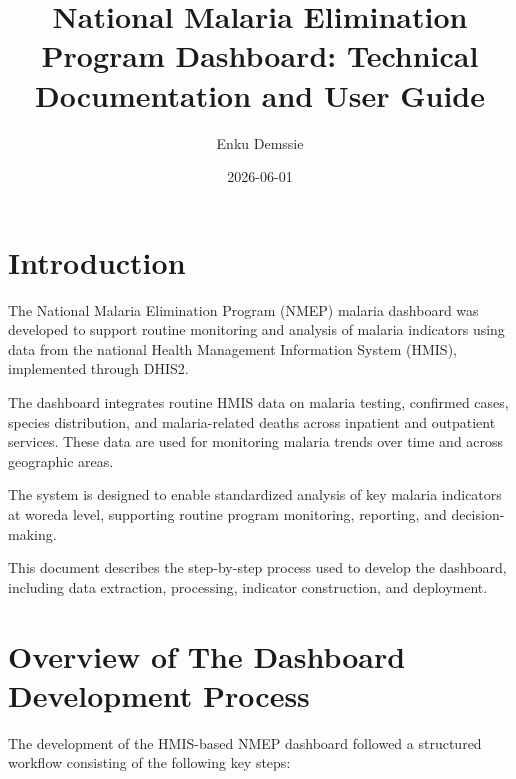 \documentclass[
  letterpaper,
  DIV=11,
  numbers=noendperiod]{scrartcl}
\title{National Malaria Elimination Program Dashboard: Technical
Documentation and User Guide}
\author{Enku Demssie}
\date{2026-06-01}
\renewcommand*\contentsname{Table of contents}
\newcommand\contentsname{Table of contents}
\begin{document}
\maketitle

\renewcommand*\contentsname{Table of contents}
{
\hypersetup{linkcolor=}
\setcounter{tocdepth}{4}
\tableofcontents
}

\section{Introduction}\label{introduction}

The National Malaria Elimination Program (NMEP) malaria dashboard was
developed to support routine monitoring and analysis of malaria
indicators using data from the national Health Management Information
System (HMIS), implemented through DHIS2.

The dashboard integrates routine HMIS data on malaria testing, confirmed
cases, species distribution, and malaria-related deaths across inpatient
and outpatient services. These data are used for monitoring malaria
trends over time and across geographic areas.

The system is designed to enable standardized analysis of key malaria
indicators at woreda level, supporting routine program monitoring,
reporting, and decision-making.

This document describes the step-by-step process used to develop the
dashboard, including data extraction, processing, indicator
construction, and deployment.

\section{Overview of The Dashboard Development
Process}\label{overview-of-the-dashboard-development-process}

The development of the HMIS-based NMEP dashboard followed a structured
workflow consisting of the following key steps:
\end{document}
